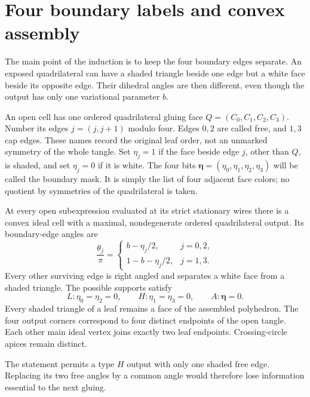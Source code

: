 \section{Four boundary labels and convex assembly}\label{sm:masks}

The main point of the induction is to keep the four boundary edges
separate. An exposed quadrilateral can have a shaded triangle beside
one edge but a white face beside its opposite edge. Their dihedral
angles are then different, even though the output has only one
variational parameter $b$.

An open cell has one ordered quadrilateral gluing face
$Q=(C_0,C_1,C_2,C_3)$. Number its edges $j=(j,j+1)$ modulo four.
Edges $0,2$ are called free, and $1,3$ cap edges. These names record
the original leaf order, not an unmarked symmetry of the whole tangle.
Set $\eta_j=1$ if the face beside edge $j$, other than $Q$, is shaded,
and set $\eta_j=0$ if it is white. The four bits
$\boldsymbol\eta=(\eta_0,\eta_1,\eta_2,\eta_3)$ will be called the
boundary mask. It is simply the list of four adjacent face colors;
no quotient by symmetries of the quadrilateral is taken.

\begin{proposition}\label{sm:mask-invariant}
At every open subexpression evaluated at its strict stationary wires
there is a convex ideal cell with a maximal, nondegenerate ordered
quadrilateral output. Its boundary-edge angles are
\begin{equation}\label{sm:masked-angles}
 \frac{\theta_j}{\pi}=
 \begin{cases}
 b-\eta_j/2,&j=0,2,\\
 1-b-\eta_j/2,&j=1,3.
 \end{cases}
\end{equation}
Every other surviving edge is right angled and separates a white
face from a shaded triangle. The possible supports satisfy
\begin{equation}\label{sm:mask-support}
 L:\eta_0=\eta_2=0,\qquad H:\eta_1=\eta_3=0,\qquad
 A:\boldsymbol\eta=0.
\end{equation}
Every shaded triangle of a leaf remains a face of the assembled
polyhedron. The four output corners correspond to four distinct
endpoints of the open tangle. Each other main ideal vertex joins
exactly two leaf endpoints. Crossing-circle apices remain distinct.
\end{proposition}

The statement permits a type $H$ output with only one shaded free
edge. Replacing its two free angles by a common angle would therefore
lose information essential to the next gluing.

